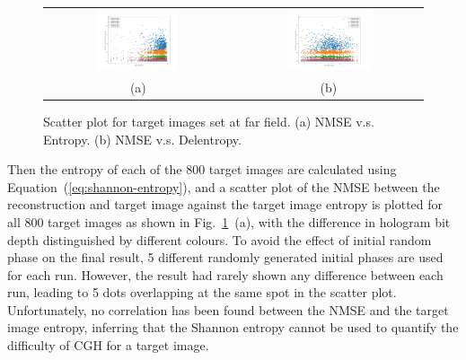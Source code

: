 	\begin{figure} [ht]
		\begin{center}
			\begin{tabular}{c c}
				\includegraphics[trim={80 50 90 70}, clip, width = 0.45\textwidth]{GS_Fraunhofer_NMSE_VS_Entropy.png} &
				\includegraphics[trim={80 50 90 70}, clip, width = 0.45\textwidth]{GS_Fraunhofer_NMSE_VS_Delentropy.png} \\
				(a) & (b)
			\end{tabular}
			\caption{\label{fig:GS_Fraunhofer_NMSE_VS_Entropy_Delentropy} Scatter plot for target images set at far field. (a) NMSE v.s. Entropy. (b) NMSE v.s. Delentropy.}
		\end{center}
	\end{figure}
	
	Then the entropy of each of the 800 target images are calculated using Equation~(\ref{eq:shannon-entropy}), and a scatter plot of the NMSE between the reconstruction and target image against the target image entropy is plotted for all 800 target images as shown in Fig.~\ref{fig:GS_Fraunhofer_NMSE_VS_Entropy_Delentropy}~(a), with the difference in hologram bit depth distinguished by different colours. To avoid the effect of initial random phase on the final result, 5 different randomly generated initial phases are used for each run. However, the result \cite{research_data_Sha2024} had rarely shown any difference between each run, leading to 5 dots overlapping at the same spot in the scatter plot. Unfortunately, no correlation has been found between the NMSE and the target image entropy, inferring that the Shannon entropy cannot be used to quantify the difficulty of CGH for a target image. 
	
